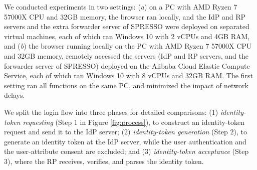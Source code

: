 We conducted experiments in two settings: (\emph{a}) on a PC with AMD Ryzen 7 57000X CPU and 32GB memory, the browser ran locally, and the IdP and RP servers and the extra forwarder server of SPRESSO were deployed on separated virtual machines, each of which ran Windows 10 with 2 vCPUs and 4GB RAM, and (\emph{b}) the browser running locally on the PC with AMD Ryzen 7 57000X CPU and 32GB memory, remotely accessed the servers (IdP and RP servers, and the forwarder server of SPRESSO) deployed on the Alibaba Cloud Elastic Compute Service, each of which ran Windows 10 with 8 vCPUs and 32GB RAM. 
The first setting ran all functions on the same PC,
    and minimized the impact of network delays.




 We split the login flow into three phases for detailed comparisons: (1)
{\em identity-token requesting} (Step 1 in Figure \ref{fig:process}), to construct an identity-token request and send it to the IdP server; (2) {\em identity-token generation} (Step 2), to generate an identity token at the IdP server, while the user authentication and the user-attribute consent are excluded; and (3) {\em identity-token acceptance} (Step 3), where the RP receives, verifies, and parses the identity token.



